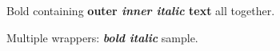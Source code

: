 Bold containing \textbf{outer \emph{inner italic} text} all together.

Multiple wrappers: \textbf{\textit{bold italic}} sample.
